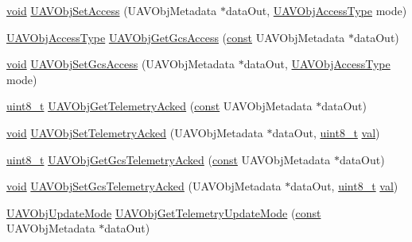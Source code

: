 \begin{DoxyCompactItemize}
\item 
\hyperlink{group___n_a_m_e_ga18028b8badbf1ea7e704ccac3c488e82}{void} \hyperlink{group___u_a_v_ga29fdfe989554569b883689bc2a5dbed7}{U\-A\-V\-Obj\-Set\-Access} (U\-A\-V\-Obj\-Metadata $\ast$data\-Out, \hyperlink{group___u_a_v_ga04b37fd239d7727a21668d35d11ad7df}{U\-A\-V\-Obj\-Access\-Type} mode)
\item 
\hyperlink{group___u_a_v_ga04b37fd239d7727a21668d35d11ad7df}{U\-A\-V\-Obj\-Access\-Type} \hyperlink{group___u_a_v_ga51636545d038f8325f49ccf59e267ac0}{U\-A\-V\-Obj\-Get\-Gcs\-Access} (\hyperlink{group___n_a_m_e_ga7ae6d0e43244213b34de2c2b9aa30da6}{const} U\-A\-V\-Obj\-Metadata $\ast$data\-Out)
\item 
\hyperlink{group___n_a_m_e_ga18028b8badbf1ea7e704ccac3c488e82}{void} \hyperlink{group___u_a_v_ga383e0110a1fdfabeb9981a8f2741aee9}{U\-A\-V\-Obj\-Set\-Gcs\-Access} (U\-A\-V\-Obj\-Metadata $\ast$data\-Out, \hyperlink{group___u_a_v_ga04b37fd239d7727a21668d35d11ad7df}{U\-A\-V\-Obj\-Access\-Type} mode)
\item 
\hyperlink{stdint_8h_aba7bc1797add20fe3efdf37ced1182c5}{uint8\-\_\-t} \hyperlink{group___u_a_v_gac9f7bbeb11a4491c07b5fea872f0fed8}{U\-A\-V\-Obj\-Get\-Telemetry\-Acked} (\hyperlink{group___n_a_m_e_ga7ae6d0e43244213b34de2c2b9aa30da6}{const} U\-A\-V\-Obj\-Metadata $\ast$data\-Out)
\item 
\hyperlink{group___n_a_m_e_ga18028b8badbf1ea7e704ccac3c488e82}{void} \hyperlink{group___u_a_v_ga8c592da55ae510fdd9c2acac8b0f05f1}{U\-A\-V\-Obj\-Set\-Telemetry\-Acked} (U\-A\-V\-Obj\-Metadata $\ast$data\-Out, \hyperlink{stdint_8h_aba7bc1797add20fe3efdf37ced1182c5}{uint8\-\_\-t} \hyperlink{group___p_i_o_s___t_i_m_ga757344f09097232d715d55cbf9d61a43}{val})
\item 
\hyperlink{stdint_8h_aba7bc1797add20fe3efdf37ced1182c5}{uint8\-\_\-t} \hyperlink{group___u_a_v_gae86936c7a9ed724e76e027860cadcb9e}{U\-A\-V\-Obj\-Get\-Gcs\-Telemetry\-Acked} (\hyperlink{group___n_a_m_e_ga7ae6d0e43244213b34de2c2b9aa30da6}{const} U\-A\-V\-Obj\-Metadata $\ast$data\-Out)
\item 
\hyperlink{group___n_a_m_e_ga18028b8badbf1ea7e704ccac3c488e82}{void} \hyperlink{group___u_a_v_gacc8cf4f2c88a0d8b21bac9f8d886d8e6}{U\-A\-V\-Obj\-Set\-Gcs\-Telemetry\-Acked} (U\-A\-V\-Obj\-Metadata $\ast$data\-Out, \hyperlink{stdint_8h_aba7bc1797add20fe3efdf37ced1182c5}{uint8\-\_\-t} \hyperlink{group___p_i_o_s___t_i_m_ga757344f09097232d715d55cbf9d61a43}{val})
\item 
\hyperlink{group___u_a_v_gafd571f69747daf7681eb869270e27208}{U\-A\-V\-Obj\-Update\-Mode} \hyperlink{group___u_a_v_ga7f771858f21fab6e07ce484f4e3a0ebe}{U\-A\-V\-Obj\-Get\-Telemetry\-Update\-Mode} (\hyperlink{group___n_a_m_e_ga7ae6d0e43244213b34de2c2b9aa30da6}{const} U\-A\-V\-Obj\-Metadata $\ast$data\-Out)

\end{DoxyCompactItemize}
